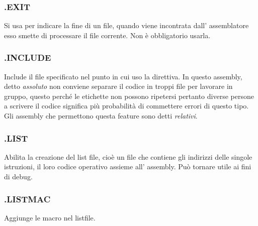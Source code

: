 \subsubsection{.EXIT}
Si usa per indicare la fine di un file, quando viene incontrata dall' assemblatore esso smette di processare il file corrente.
Non è obbligatorio usarla.

\subsubsection{.INCLUDE}
Include il file specificato nel punto in cui uso la direttiva.
In questo assembly, detto \emph{assoluto} non conviene separare il codice in troppi file per lavorare in gruppo, questo perché le etichette non possono ripetersi pertanto diverse persone a scrivere il codice significa più probabilità di commettere errori di questo tipo.
Gli assembly che permettono questa feature sono detti \emph{relativi}.

\subsubsection{.LIST}
Abilita la creazione del list file, cioè un file che contiene gli indirizzi delle singole istruzioni, il loro codice operativo assieme all' assembly.
Può tornare utile ai fini di debug.

\subsubsection{.LISTMAC}
Aggiunge le macro nel listfile.


